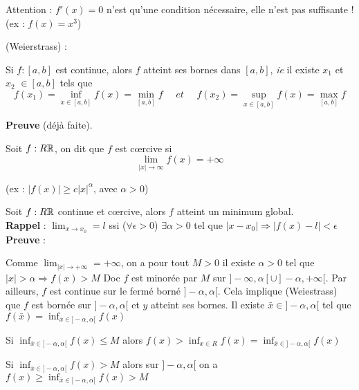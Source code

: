		Attention : $f'(x) = 0$ n'est qu'une condition nécessaire, elle n'est pas suffisante ! (ex : $f(x) = x^3$)
		
		\begin{theoreme} (Weierstrass) :

		
		Si $f : [a, b]$ est continue, alors $f$ atteint ses bornes dans $[a, b]$, \textit{ie} il existe $x_1$ et $x_2$ $ \in [a, b]$ tels que \[ f(x_1) = \inf_{x \in [a, b]} f(x) = \min_{[a, b]} f \quad\textit{ et }\quad\displaystyle f(x_2) = \sup_{x \in [a, b]} f(x) = \max_{[a, b]} f\]
		\end{theoreme}
		
		\textbf{Preuve} (déjà faite).\\
		
		\begin{definition}
		
		Soit $f : R \mathbb{R}$, on dit que $f$ est c\oe rcive si \[ \lim_{|x| \rightarrow \infty} f(x) = + \infty \]
		\end{definition}
		
		(ex : $|f(x)| \geq c|x|^\alpha$, avec $\alpha > 0$)
		
		Soit $f : R \mathbb{R}$ continue et c\oe rcive, alors $f$ atteint un minimum global.\\
		
		\textbf{Rappel} : $\displaystyle \lim_{x \rightarrow x_0} = l$ ssi ($\forall \epsilon >0$) $\exists \alpha >0$ tel que $|x-x_0| \Rightarrow |f(x) - l| < \epsilon$\\
		
		\textbf{Preuve} :
		
		Comme $\displaystyle \lim_{|x| \rightarrow + \infty} = +\infty$, on a pour tout $M>0$ il existe $\alpha >0$ tel que $|x|>\alpha \Rightarrow f(x)>M$
		Doc $f$ est minorée par $M$ sur $]-\infty, \alpha[ \cup ]-\alpha, +\infty[$. Par ailleurs, $f$ est continue sur le fermé borné $]-\alpha, \alpha[$.
		Cela implique (Weiestrass) que $f$ est bornée sur $]-\alpha, \alpha[$ et $y$ atteint ses bornes.
		Il existe $ \bar{x} \in ]-\alpha, \alpha[$ tel que $\displaystyle f(\bar{x}) = \inf_{\bar{x} \in ]-\alpha, \alpha[} f(x)$
		
		Si $\displaystyle \inf_{\bar{x} \in ]-\alpha, \alpha[} f(x) \leq M$ alors $\displaystyle f(x) > \inf_{x \in R} f(x) = \inf_{\bar{x} \in ]-\alpha, \alpha[} f(x)$
		
		Si $\displaystyle \inf_{\bar{x} \in ]-\alpha, \alpha[} f(x) > M$ alors sur $]-\alpha, \alpha[$ on a $\displaystyle f(x) \geq \inf_{\bar{x} \in ]-\alpha, \alpha[} f(x) > M$
		
